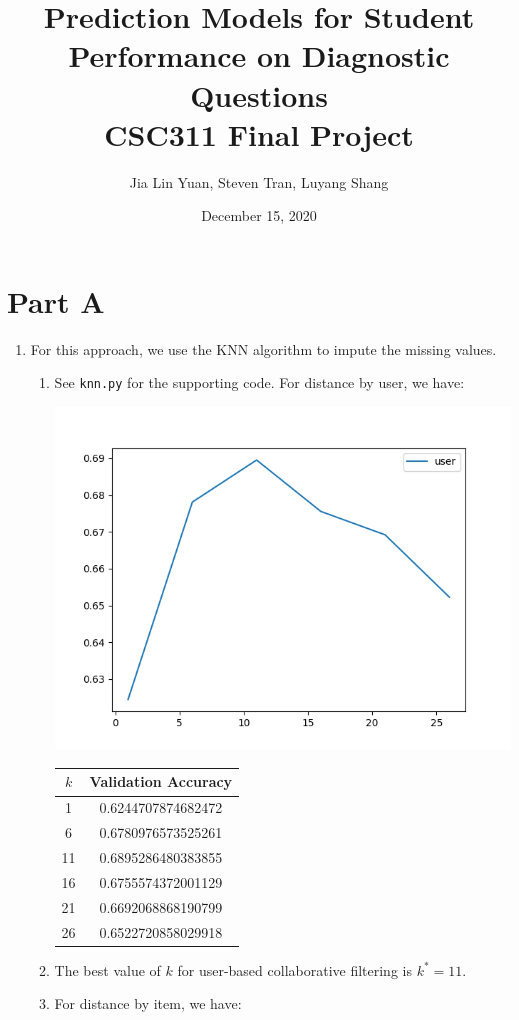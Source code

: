 \documentclass{article}
\title{Prediction Models for Student Performance on Diagnostic Questions\\
\Large CSC311 Final Project}
\author{Jia Lin Yuan, Steven Tran, Luyang Shang}
\date{December 15, 2020}
\begin{document}
\maketitle
\section{Part A}
\begin{enumerate}[label=\arabic*.]
    \item For this approach, we use the KNN algorithm to impute the missing values.
        \begin{enumerate}[label=(\alph*)]
            \item See \texttt{knn.py} for the supporting code. For distance by user, we have:

                \noindent
                \begin{minipage}{0.5\linewidth}
                    \centering
                    \includegraphics[width=\linewidth]{../starter_code/figs/knn_user.png}
                \end{minipage}\hfill
                \begin{minipage}{0.5\linewidth}
                    \center
                    \begin{tabular}{c|c}
                        $k$ & Validation Accuracy \\\hline
                        1 & 0.6244707874682472\\
                        6 & 0.6780976573525261\\
                        11 & 0.6895286480383855\\
                        16 & 0.6755574372001129\\
                        21 & 0.6692068868190799\\
                        26 & 0.6522720858029918
                    \end{tabular}
                \end{minipage}
            \item The best value of $k$ for user-based collaborative filtering is $k^*=11$.
            \item For distance by item, we have:


\end{enumerate}
\end{enumerate}
\end{document}
